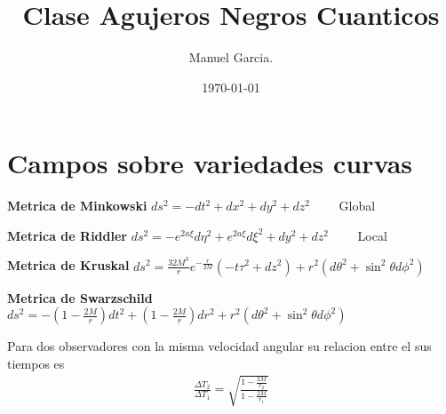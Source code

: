 \documentclass{article}
\title{Clase Agujeros Negros Cuanticos }
\author{Manuel Garcia.}
\date{\today}
\begin{document}
\maketitle

\section{Campos sobre variedades curvas }

\hfill

\textbf{Metrica de Minkowski } $ ds^2 = -dt^2 + dx^2 + dy^2 + dz^2 \qquad  $ Global

\textbf{Metrica de Riddler } $ ds ^2 = - e ^ {2 a \xi } d\eta^2 + e ^ {2 a \xi }d\xi^2 + dy^2 + dz^2  \qquad  $ Local  

\textbf{Metrica de Kruskal }$ ds^2 = \frac{32M^3 }{r} e ^ {-\frac{r}{2M }}(-t\tau^2 + dz^2 ) + r^2(d\theta^2 + \sin^2{\theta}d\phi^2) \qquad $ 

\textbf{Metrica de Swarzschild } $ ds^2 = - \left(1 - \frac{2M }{ r }\right)dt^2 + \left(1 - \frac{2M }{r }\right)dr^2 + r^2 \left(d\theta^2 + \sin^2{\theta }d\phi^2 \right) $

Para dos observadores con la misma velocidad angular su relacion entre el sus tiempos es 
\begin{gather*}
  \frac{\Delta T_2 }{\Delta T_1 } = \sqrt{\frac{1 - \frac{2M }{r_2 }}{1 - \frac{2M }{r_1 }}}
\end{gather*}
\end{document}
